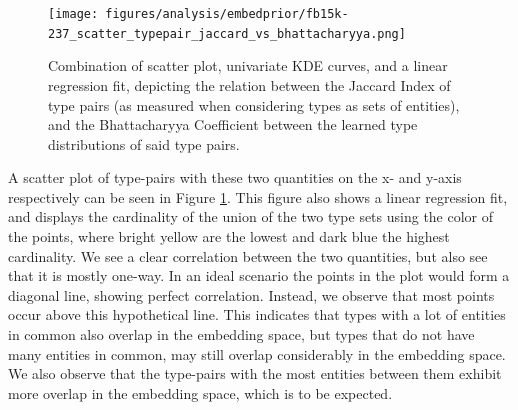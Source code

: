 \begin{figure}
    \centering                             %
    \texttt{[image: figures/analysis/embedprior/fb15k-237\_scatter\_typepair\_jaccard\_vs\_bhattacharyya.png]}
    \caption[Plot depicting Jaccard index of type pairs with the Bhattacharyya Distance between the learned distributions of those pairs.]{Combination of scatter plot, univariate KDE curves, and a linear regression fit, depicting the relation between the Jaccard Index of type pairs (as measured when considering types as sets of entities), and the Bhattacharyya Coefficient between the learned type distributions of said type pairs.}
    \label{fig:embedprior_jaccard_vs_bhattacharyya}
\end{figure}
A scatter plot of type-pairs with these two quantities on the x- and y-axis respectively can be seen in Figure \ref{fig:embedprior_jaccard_vs_bhattacharyya}. This figure also shows a linear regression fit, and displays the cardinality of the union of the two type sets using the color of the points, where bright yellow are the lowest and dark blue the highest cardinality.
We see a clear correlation between the two quantities, but also see that it is mostly one-way. In an ideal scenario the points in the plot would form a diagonal line, showing perfect correlation. Instead, we observe that most points occur above this hypothetical line. This indicates that types with a lot of entities in common also overlap in the embedding space, but types that do not have many entities in common, may still overlap considerably in the embedding space. We also observe that the type-pairs with the most entities between them exhibit more overlap in the embedding space, which is to be expected.



